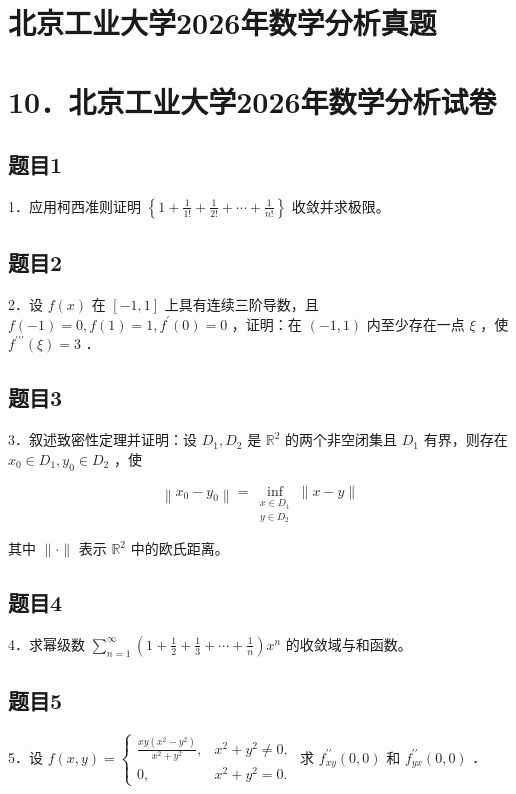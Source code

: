 \documentclass{article}
\begin{document}
\section*{北京工业大学2026年数学分析真题}
\section*{10．北京工业大学2026年数学分析试卷}

\subsection{题目1}
1．应用柯西准则证明 \(\left\{1+\frac{1}{1!}+\frac{1}{2!}+\cdots+\frac{1}{n!}\right\}\) 收敛并求极限。

\subsection{题目2}
2．设 \(f(x)\) 在 \([-1,1]\) 上具有连续三阶导数，且 \(f(-1)=0, f(1)=1, f^{\prime}(0)=0\) ，证明：在 \((-1,1)\) 内至少存在一点 \(\xi\) ，使 \(f^{\prime \prime \prime}(\xi)=3\) ．

\subsection{题目3}
3．叙述致密性定理并证明：设 \(D_{1}, D_{2}\) 是 \(\mathbb{R}^{2}\) 的两个非空闭集且 \(D_{1}\) 有界，则存在 \(x_{0} \in D_{1}, y_{0} \in D_{2}\) ，使

\[
\left\|x_{0}-y_{0}\right\|=\inf _{\substack{x \in D_{1} \\ y \in D_{2}}}\|x-y\|
\]

其中 \(\|\cdot\|\) 表示 \(\mathbb{R}^{2}\) 中的欧氏距离。

\subsection{题目4}
4．求幂级数 \(\sum_{n=1}^{\infty}\left(1+\frac{1}{2}+\frac{1}{3}+\cdots+\frac{1}{n}\right) x^{n}\) 的收敛域与和函数。

\subsection{题目5}
5．设 \(f(x, y)=\left\{\begin{array}{ll}\frac{x y\left(x^{2}-y^{2}\right)}{x^{2}+y^{2}}, & x^{2}+y^{2} \neq 0, \\ 0, & x^{2}+y^{2}=0 .\end{array}\right.\) 求 \(f_{x y}^{\prime \prime}(0,0)\) 和 \(f_{y x}^{\prime \prime}(0,0)\) ．
\end{document}
